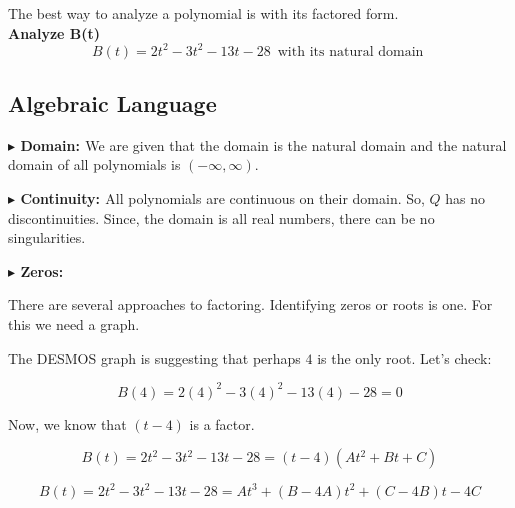 \documentclass{ximera}
\author{Lee Wayand}
\begin{document}
\begin{exercise}



The best way to analyze a polynomial is with its factored form. \\


\textbf{Analyze B(t)} \\

\[
B(t) = 2 t^2 - 3 t^2 - 13 t - 28 \, \text { with its natural domain } 
\]






\subsection{Algebraic Language}



\textbf{\textcolor{blue!55!black}{$\blacktriangleright$ Domain: }} We are given that the domain is the natural domain and the natural domain of all polynomials is $(-\infty, \infty)$.


\textbf{\textcolor{blue!55!black}{$\blacktriangleright$ Continuity: }}  All polynomials are continuous on their domain.  So, $Q$ has no discontinuities.  Since, the domain is all real numbers, there can be no singularities.



\textbf{\textcolor{blue!55!black}{$\blacktriangleright$ Zeros: }}  


There are several approaches to factoring.  Identifying zeros or roots is one.  For this we need a graph.




\begin{center}
\end{center}



The DESMOS graph is suggesting that perhaps $4$ is the only root.  Let's check:



\[
B(4) = 2 (4)^2 - 3 (4)^2 - 13 (4) - 28 = 0
\]




Now, we know that $(t-4)$ is a factor.  




\[
B(t) = 2 t^2 - 3 t^2 - 13 t - 28 = (t-4)(A t^2 + B t + C)
\]




\[
B(t) = 2 t^2 - 3 t^2 - 13 t - 28 = A t^3 + (B - 4 A) t^2 + (C - 4 B) t - 4 C 
\]



\end{exercise}
\end{document}
